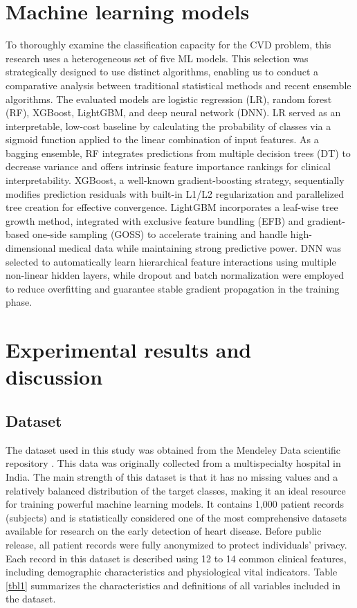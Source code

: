 \documentclass[twoside]{article}
\begin{document}


\section{Machine learning models}
To thoroughly examine the classification capacity for the CVD problem, this research uses a heterogeneous set of five ML models. This selection was strategically designed to use distinct algorithms, enabling us to conduct a comparative analysis between traditional statistical methods and recent ensemble algorithms. The evaluated models are logistic regression (LR), random forest (RF), XGBoost, LightGBM, and deep neural network (DNN). LR served as an interpretable, low-cost baseline by calculating the probability of classes via a sigmoid function applied to the linear combination of input features. As a bagging ensemble, RF integrates predictions from multiple decision trees (DT) to decrease variance and offers intrinsic feature importance rankings for clinical interpretability. XGBoost, a well-known gradient-boosting strategy, sequentially modifies prediction residuals with built-in L1/L2 regularization and parallelized tree creation for effective convergence. LightGBM incorporates a leaf-wise tree growth method, integrated with exclusive feature bundling (EFB) and gradient-based one-side sampling (GOSS) to accelerate training and handle high-dimensional medical data while maintaining strong predictive power. DNN was selected to automatically learn hierarchical feature interactions using multiple non-linear hidden layers, while dropout and batch normalization were employed to reduce overfitting and guarantee stable gradient propagation in the training phase.

\section{Experimental results and discussion}
\subsection{Dataset}
The dataset used in this study was obtained from the Mendeley Data scientific repository \cite{Doppala2021}. This data was originally collected from a multispecialty hospital in India. The main strength of this dataset is that it has no missing values and a relatively balanced distribution of the target classes, making it an ideal resource for training powerful machine learning models. It contains 1,000 patient records (subjects) and is statistically considered one of the most comprehensive datasets available for research on the early detection of heart disease. Before public release, all patient records were fully anonymized to protect individuals’ privacy. Each record in this dataset is described using 12 to 14 common clinical features, including demographic characteristics and physiological vital indicators. Table \ref{tbl1} summarizes the characteristics and definitions of all variables included in the dataset.
\end{document}
